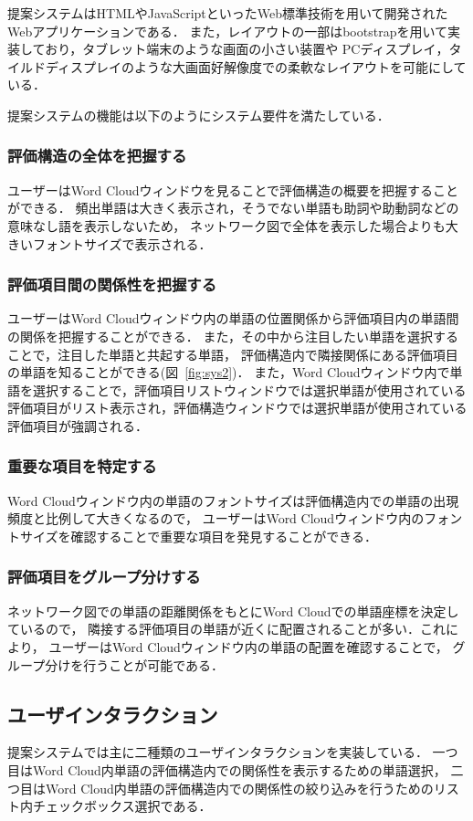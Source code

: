 \documentclass[syuuron]{kuee}
\begin{document}
			提案システムはHTMLやJavaScriptといったWeb標準技術を用いて開発されたWebアプリケーションである．
			また，レイアウトの一部はbootstrapを用いて実装しており，タブレット端末のような画面の小さい装置や
			PCディスプレイ，タイルドディスプレイのような大画面好解像度での柔軟なレイアウトを可能にしている．
			
			提案システムの機能は以下のようにシステム要件を満たしている．
			\subsubsection{評価構造の全体を把握する}
				ユーザーはWord Cloudウィンドウを見ることで評価構造の概要を把握することができる．
				頻出単語は大きく表示され，そうでない単語も助詞や助動詞などの意味なし語を表示しないため，
				ネットワーク図で全体を表示した場合よりも大きいフォントサイズで表示される．
			\subsubsection{評価項目間の関係性を把握する}
				ユーザーはWord Cloudウィンドウ内の単語の位置関係から評価項目内の単語間の関係を把握することができる．
				また，その中から注目したい単語を選択することで，注目した単語と共起する単語，
				評価構造内で隣接関係にある評価項目の単語を知ることができる(図~\ref{fig:sys2})．
				また，Word Cloudウィンドウ内で単語を選択することで，評価項目リストウィンドウでは選択単語が使用されている
				評価項目がリスト表示され，評価構造ウィンドウでは選択単語が使用されている
				評価項目が強調される．
			\subsubsection{重要な項目を特定する}
				Word Cloudウィンドウ内の単語のフォントサイズは評価構造内での単語の出現頻度と比例して大きくなるので，
				ユーザーはWord Cloudウィンドウ内のフォントサイズを確認することで重要な項目を発見することができる．
			\subsubsection{評価項目をグループ分けする}%
				ネットワーク図での単語の距離関係をもとにWord Cloudでの単語座標を決定しているので，
				隣接する評価項目の単語が近くに配置されることが多い．これにより，
				ユーザーはWord Cloudウィンドウ内の単語の配置を確認することで，
				グループ分けを行うことが可能である．
			
		\subsection{ユーザインタラクション}
			提案システムでは主に二種類のユーザインタラクションを実装している．
			一つ目はWord Cloud内単語の評価構造内での関係性を表示するための単語選択，
			二つ目はWord Cloud内単語の評価構造内での関係性の絞り込みを行うためのリスト内チェックボックス選択である．
			
\end{document}

